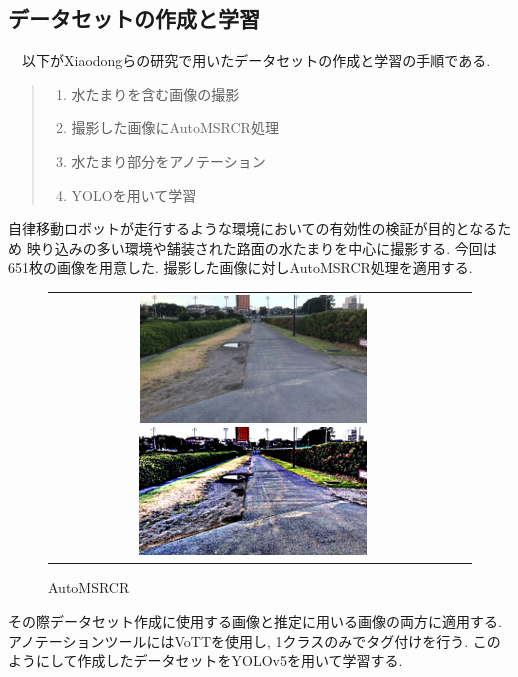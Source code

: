 \documentclass[10pt]{jarticle}
\begin{document}
    \subsection{データセットの作成と学習}
    　以下がXiaodongらの研究で用いたデータセットの作成と学習の手順である. 
    \begin{quote}
        \begin{enumerate}
         \item 水たまりを含む画像の撮影
         \item 撮影した画像にAutoMSRCR処理
         \item 水たまり部分をアノテーション
         \item YOLOを用いて学習
        \end{enumerate}
       \end{quote}
    自律移動ロボットが走行するような環境においての有効性の検証が目的となるため
    映り込みの多い環境や舗装された路面の水たまりを中心に撮影する. 今回は651枚の画像を用意した. 
    撮影した画像に対しAutoMSRCR処理を適用する. 
    \begin{figure}[H]
        \begin{tabular}{cc}
            \begin{minipage}{.1\textwidth}
                \vspace{5mm}\centering
                \includegraphics[width=2.0\linewidth]{./fig/fig1.png}
                \caption{Original}
                \label{fig_first}
            \end{minipage}
            \begin{minipage}{.5\textwidth}
                \vspace{5mm}\centering\centering
                \includegraphics[width=0.4\linewidth]{./fig/fig2.png}
                \caption{AutoMSRCR}
                \label{fig_second}
            \end{minipage}
        \end{tabular}
    \end{figure}
    その際データセット作成に使用する画像と推定に用いる画像の両方に適用する. 
    アノテーションツールにはVoTTを使用し, 1クラスのみでタグ付けを行う. 
    このようにして作成したデータセットをYOLOv5を用いて学習する. 
\end{document}
